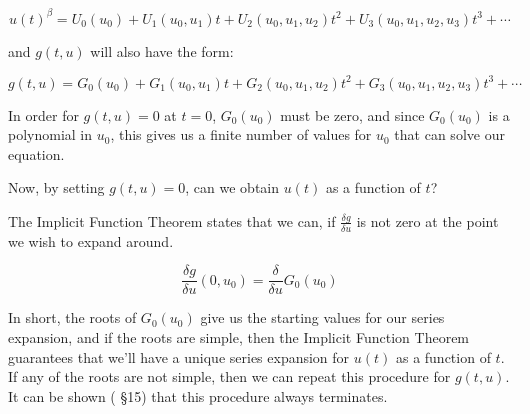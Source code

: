 $$u(t)^\beta = U_0(u_0) + U_1(u_0, u_1) t + U_2(u_0, u_1, u_2) t^2 + U_3(u_0,u_1,u_2,u_3) t^3 + \cdots$$

and $g(t,u)$ will also have the form:

$$g(t,u) = G_0(u_0) + G_1(u_0, u_1) t + G_2(u_0, u_1, u_2) t^2 + G_3(u_0,u_1,u_2,u_3) t^3 + \cdots$$

In order for $g(t,u)=0$ at $t=0$, $G_0(u_0)$ must be zero, and since $G_0(u_0)$ is a polynomial
in $u_0$, this gives us a finite number of values for $u_0$ that can solve our equation.

Now, by setting $g(t,u)=0$, can we obtain $u(t)$ as a function of $t$?

The Implicit Function Theorem states that we can, if $\frac{\delta g}{\delta u}$ is not zero
at the point we wish to expand around.

$$\frac{\delta g}{\delta u}(0,u_0) = \frac{\delta}{\delta u} G_0(u_0)$$

In short, the roots of $G_0(u_0)$ give us the starting values for our series expansion,
and if the roots are simple, then the Implicit Function Theorem guarantees that we'll
have a unique series expansion for $u(t)$ as a function of $t$.  If any of the roots
are not simple, then we can repeat this procedure for $g(t,u)$.  It can be shown
(\cite{bliss} \S 15) that this procedure always terminates.

\vfill\eject

